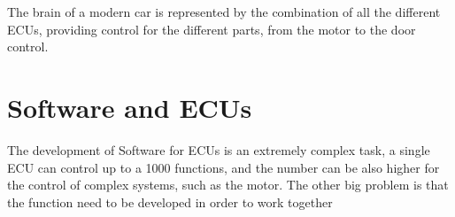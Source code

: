 \documentclass[../main.tex]{subfiles}
\begin{document}
The brain of a modern car is represented by the combination of all the different ECUs, providing control for the different parts, from the motor to the door control. 
\section{Software and ECUs}
The development of Software for ECUs is an extremely complex task, a single ECU can control up to a 1000 functions, and the number can be also higher for the control of complex systems, such as the motor. The other big problem is that the function need to be developed in order to work together 
\cleardoublepage
\end{document}
